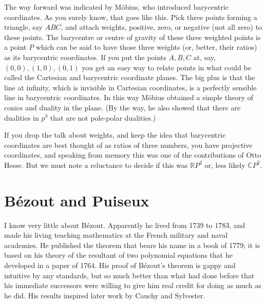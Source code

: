\documentclass[11pt]{book}
\newcommand{\R}{\mathbb{R}}
\newcommand{\C}{\mathbb{C}}
\begin{document}
The way forward was indicated by M\"obius, who introduced barycentric coordinates. As you surely know, that goes like this. Pick three points forming a triangle, say $ABC$, and attach weights, positive, zero, or negative (not all zero) to these points. The barycentre or centre of gravity of these three weighted points is a point $P$ which can be said to have those three weights (or, better, their ratios) as its barycentric coordinates. If you put the points $A, B, C$ at, say,  $(0, 0), (1, 0), (0, 1)$ you get an easy way to relate points in what could be called the Cartesian and barycentric coordinate planes. The big plus is that the line at infinity, which is invisible in Cartesian coordinates, is a perfectly sensible line in barycentric coordinates. In this way M\"obius obtained a simple theory of conics and duality in the plane. (By the way, he also showed that there are dualities in $p^3$ that are not pole-polar dualities.)

If you drop the talk about weights, and keep the idea that barycentric coordinates are best thought of as ratios of three numbers, you have projective coordinates, and speaking from memory this was one of the contributions of Otto Hesse. But we must note a reluctance to decide if this was $\R P^2$ or, less likely $\C P^2$.


\section{B\'ezout and Puiseux}
I know very little about B\'ezout. Apparently he lived from 1739 to 1783, and made his living teaching mathematics at the French military and naval academies. He published the theorem that bears his name in a book of 1779; it is based on his theory of the resultant of two polynomial equations that he developed in a paper of 1764. His proof of B\'ezout's theorem is gappy and intuitive by any standards, but so much better than what had done before that his immediate successors were willing to give him real credit for doing as much as he did. His results inspired later work by Cauchy and Sylvester.
\end{document}
